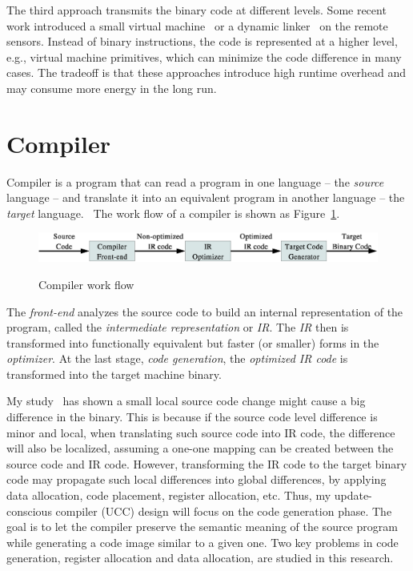 The third approach transmits the binary code at different levels.  Some recent work introduced a small virtual 
machine~\cite{mate} or a dynamic linker~\cite{related:dynamic2,related:dynamic1} on the remote sensors. Instead of 
binary instructions, the code is represented at a higher level, e.g., virtual machine primitives,
which can minimize the code difference in many cases. The tradeoff is that these approaches introduce high runtime 
overhead and may consume more energy in the long run.


\section{Compiler}

Compiler is a program that can read a program in one language -- the \textit{source} language -- and translate it into 
an equivalent program in another language -- the \textit{target} language.~\cite{compiler}
The work flow of a compiler is shown as Figure~\ref{fig:compiler}.

\begin{figure}[htbp]
	\centering
		\includegraphics[scale=0.45]{figures/compiler.eps}
	\label{fig:compiler}
	\caption{Compiler work flow}
\end{figure}

The \textit{front-end} analyzes the source code to build an internal representation of the program, called the 
\textit{intermediate representation} or \textit{IR}. The \textit{IR} then is transformed into functionally equivalent 
but faster (or smaller) forms in the \textit{optimizer}. At the last stage, \textit{code generation}, the 
\textit{optimized IR code} is transformed into the target machine binary.

My study~\cite{ucc} has shown a small local source code change might cause a big difference in the binary. This is 
because if the source code level difference is minor and local, when translating such source code into IR code, the 
difference will also be localized, assuming a one-one mapping can be created between the source code and IR code. 
However, transforming the IR code to the target binary code may propagate such local differences into global 
differences, by applying data allocation, code placement, register allocation, etc. Thus, my update-conscious 
compiler (UCC) design will focus on the code generation phase. The goal is to let the compiler preserve the semantic 
meaning of the source program while generating a code image similar to a given one. Two key problems in code 
generation, register allocation and data allocation, are studied in this research.

